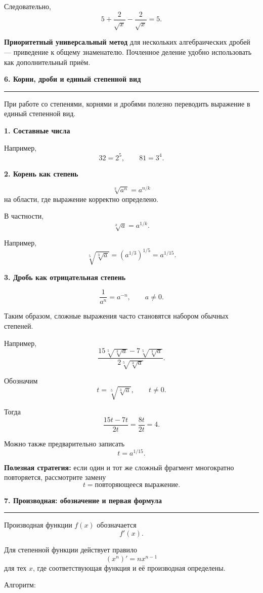 \documentclass[a4paper,12pt]{article}
\newcommand{\lessonsection}[1]{%
    \vspace{0.5em}
    {\Large\bfseries\color{darkaccent}#1}\par
    \vspace{0.2em}
    {\color{accent}\rule{\linewidth}{0.6pt}}
    \vspace{0.5em}
}
\newcommand{\important}[1]{\textbf{\color{darkaccent}#1}}
\begin{document}
Следовательно,
\[
5+\frac2{\sqrt{x}}-\frac2{\sqrt{x}}=5.
\]

\important{Приоритетный универсальный метод} для нескольких алгебраических дробей --- приведение к общему знаменателю. Почленное деление удобно использовать как дополнительный приём.


\lessonsection{6. Корни, дроби и единый степенной вид}

При работе со степенями, корнями и дробями полезно переводить выражение в единый степенной вид.

\textbf{1. Составные числа}

Например,
\[
32=2^5,
\qquad
81=3^4.
\]

\textbf{2. Корень как степень}

\[
\sqrt[k]{a^n}=a^{n/k}
\]
на области, где выражение корректно определено.

В частности,
\[
\sqrt[k]{a}=a^{1/k}.
\]

Например,
\[
\sqrt[5]{\sqrt[3]{a}}
=
\left(a^{1/3}\right)^{1/5}
=
a^{1/15}.
\]

\textbf{3. Дробь как отрицательная степень}

\[
\frac1{a^n}=a^{-n},
\qquad a\ne0.
\]

Таким образом, сложные выражения часто становятся набором обычных степеней.

Например,
\[
\frac{
15\sqrt[5]{\sqrt[3]{a}}
-
7\sqrt[5]{\sqrt[3]{a}}
}{
2\sqrt[5]{\sqrt[3]{a}}
}.
\]

Обозначим
\[
t=\sqrt[5]{\sqrt[3]{a}},
\qquad t\ne0.
\]

Тогда
\[
\frac{15t-7t}{2t}
=
\frac{8t}{2t}
=
4.
\]

Можно также предварительно записать
\[
t=a^{1/15}.
\]

\important{Полезная стратегия:}
если один и тот же сложный фрагмент многократно повторяется, рассмотрите замену
\[
t=\text{повторяющееся выражение}.
\]


\lessonsection{7. Производная: обозначение и первая формула}

Производная функции \(f(x)\) обозначается
\[
f'(x).
\]

Для степенной функции действует правило
\[
\boxed{
(x^n)'=nx^{n-1}
}
\]
для тех \(x\), где соответствующая функция и её производная определены.

Алгоритм:
\end{document}
